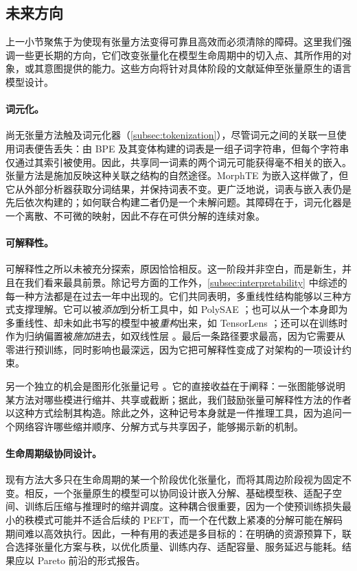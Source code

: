 \documentclass[11pt]{article}
\begin{document}
\subsection{未来方向}

上一小节聚焦于为使现有张量方法变得可靠且高效而必须清除的障碍。这里我们强调一些更长期的方向，它们改变张量化在模型生命周期中的切入点、其所作用的对象，或其意图提供的能力。这些方向将针对具体阶段的文献延伸至张量原生的语言模型设计。

\paragraph{词元化。} 

尚无张量方法触及词元化器（\cref{subsec:tokenization}），尽管词元之间的关联一旦使用词表便告丢失：由 BPE 及其变体构建的词表是一组子词字符串，但每个字符串仅通过其索引被使用。因此，共享同一词素的两个词元可能获得毫不相关的嵌入。张量方法是施加反映这种关联之结构的自然途径。MorphTE \cite{gan2022morphte} 为嵌入这样做了，但它从外部分析器获取分词结果，并保持词表不变。更广泛地说，词表与嵌入表仍是先后依次构建的；如何联合构建二者仍是一个未解问题。其障碍在于，词元化器是一个离散、不可微的映射，因此不存在可供分解的连续对象。

\paragraph{可解释性。}
可解释性之所以未被充分探索，原因恰恰相反。这一阶段并非空白，而是新生，并且在我们看来最具前景。除记号方面的工作外，\cref{subsec:interpretability} 中综述的每一种方法都是在过去一年中出现的。它们共同表明，多重线性结构能够以三种方式支撑理解。它可以被\emph{添加}到分析工具中，如 PolySAE \cite{koromilas2026polysae}；也可以从一个本身即为多重线性、却未如此书写的模型中被\emph{重构}出来，如 TensorLens \cite{atad2026tensorlens}；还可以在训练时作为归纳偏置被\emph{施加}进去，如双线性层 \cite{pearce2025bilinearmlp}。最后一条路径要求最高，因为它需要从零进行预训练，同时影响也最深远，因为它把可解释性变成了对架构的一项设计约束。

另一个独立的机会是图形化张量记号 \cite{taylor2024interpretabilitysurvey4}。它的直接收益在于阐释：一张图能够说明某方法对哪些模进行缩并、共享或截断；据此，我们鼓励张量可解释性方法的作者以这种方式绘制其构造。除此之外，这种记号本身就是一件推理工具，因为追问一个网络容许哪些缩并顺序、分解方式与共享因子，能够揭示新的机制。

\paragraph{生命周期级协同设计。}
现有方法大多只在生命周期的某一个阶段优化张量化，而将其周边阶段视为固定不变。相反，一个张量原生的模型可以协同设计嵌入分解、基础模型秩、适配子空间、训练后压缩与推理时的缩并调度。这种耦合很重要，因为一个使预训练损失最小的秩模式可能并不适合后续的 PEFT，而一个在代数上紧凑的分解可能在解码期间难以高效执行。因此，一种有用的表述是多目标的：在明确的资源预算下，联合选择张量化方案与秩，以优化质量、训练内存、适配容量、服务延迟与能耗。结果应以 Pareto 前沿的形式报告。
\end{document}
